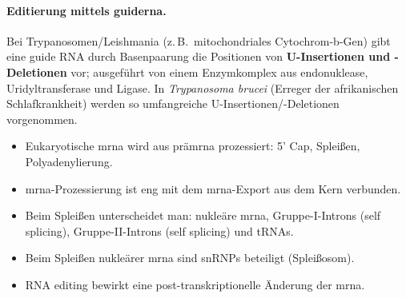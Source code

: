 \paragraph{Editierung mittels \gls{guiderna}.} Bei Trypanosomen/Leishmania
(z.\,B.\ mitochondriales Cytochrom-b-Gen) gibt eine guide RNA durch Basenpaarung
die Positionen von \textbf{U-Insertionen und -Deletionen} vor; ausgeführt von
einem Enzymkomplex aus \gls{endonuklease}, Uridyltransferase und Ligase.
In
\emph{Trypanosoma brucei} (Erreger der afrikanischen Schlafkrankheit) werden so
umfangreiche U-Insertionen/-Deletionen vorgenommen.



\begin{itemize}
    \item Eukaryotische \gls{mrna} wird aus \gls{prämrna} prozessiert: 5'
    Cap, Spleißen, Polyadenylierung.
    \item \gls{mrna}-Prozessierung ist eng mit dem \gls{mrna}-Export aus dem Kern verbunden.
    \item Beim Spleißen unterscheidet man: nukleäre \gls{mrna}, Gruppe-I-Introns
    (self splicing), Gruppe-II-Introns (self splicing) und tRNAs.
    \item Beim Spleißen nukleärer \gls{mrna} sind snRNPs beteiligt (Spleißosom).
    \item RNA editing bewirkt eine post-transkriptionelle Änderung der \gls{mrna}.
\end{itemize}

